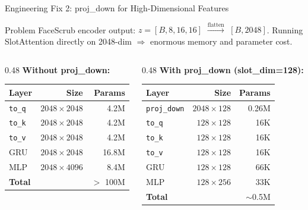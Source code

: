 \documentclass[aspectratio=169, 10pt]{beamer}
\newcommand{\code}[1]{\texttt{\small #1}}
\newcommand{\good}[1]{\textcolor{goodgreen}{#1}}
\newcommand{\warn}[1]{\textcolor{warnorg}{#1}}
\newcommand{\bad}[1]{\textcolor{bugred}{#1}}
\begin{document}
\begin{frame}{Engineering Fix 2: proj\_down for High-Dimensional Features}
\vspace{-0.1cm}

\begin{block}{Problem}
\small FaceScrub encoder output: $z=[B,8,16,16]$ $\xrightarrow{\text{flatten}}$ $[B,2048]$. Running SlotAttention directly on 2048-dim $\Rightarrow$ enormous memory and parameter cost.
\end{block}

\vspace{0.05cm}
\begin{columns}[T]
\begin{column}{0.48\textwidth}
\textbf{Without proj\_down:}
\vspace{0.05cm}
\begin{center}
\small
\begin{tabular}{lrr}
\toprule
Layer & Size & Params \\
\midrule
\code{to\_q} & $2048 \times 2048$ & 4.2M \\
\code{to\_k} & $2048 \times 2048$ & 4.2M \\
\code{to\_v} & $2048 \times 2048$ & 4.2M \\
GRU & $2048 \times 2048$ & \warn{16.8M} \\
MLP & $2048 \times 4096$ & \warn{8.4M} \\
\midrule
\textbf{Total} & & \bad{$>$ 100M} \\
\bottomrule
\end{tabular}
\end{center}
\end{column}
\begin{column}{0.48\textwidth}
\textbf{With proj\_down (slot\_dim=128):}
\vspace{0.05cm}
\begin{center}
\small
\begin{tabular}{lrr}
\toprule
Layer & Size & Params \\
\midrule
\code{proj\_down} & $2048 \times 128$ & 0.26M \\
\code{to\_q} & $128 \times 128$ & 16K \\
\code{to\_k} & $128 \times 128$ & 16K \\
\code{to\_v} & $128 \times 128$ & 16K \\
GRU & $128 \times 128$ & 66K \\
MLP & $128 \times 256$ & 33K \\
\midrule
\textbf{Total} & & \good{$\sim$0.5M} \\
\bottomrule
\end{tabular}
\end{center}
\end{column}
\end{columns}


\end{frame}
\end{document}
